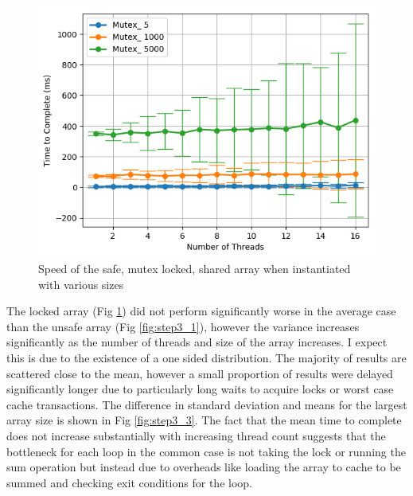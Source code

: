 \documentclass[11pt]{article}
\begin{document}
\begin{figure}
\centering
\includegraphics[scale=0.65]{step3_2.png}
\caption{Speed of the safe, mutex locked, shared array when instantiated with various sizes}
\label{fig:step3_2}
\end{figure}

The locked array (Fig \ref{fig:step3_2}) did not perform significantly worse in the average case than the unsafe array (Fig \ref{fig:step3_1}),
however the variance increases significantly as the number of threads and size of the array increases. I expect this is due to the existence of a one sided distribution. The majority of results are scattered close to the mean, however a small proportion of results were delayed significantly longer due to particularly long waits to acquire locks or worst case cache transactions. The difference in standard deviation and means for the largest array size is shown in Fig \ref{fig:step3_3}. The fact that the mean time to complete does not increase substantially with increasing thread count suggests that the bottleneck for each loop in the common case is not taking the lock or running the sum operation but instead due to overheads like loading the array to cache to be summed and checking exit conditions for the loop.
\end{document}
